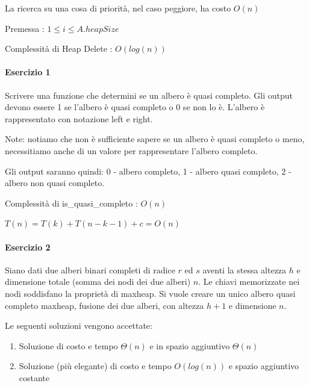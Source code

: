 \documentclass[tikz]{article}
\providecommand{\tightlist}{%
  \setlength{\itemsep}{0pt}\setlength{\parskip}{0pt}}
\let\oldparagraph\paragraph
\renewcommand{\paragraph}[1]{\oldparagraph{#1}\mbox{}}
\begin{document}
{La ricerca su una cosa di priorità, nel caso peggiore, ha costo }$O(n)$

{Premessa : $1 \leq i \leq A.heapSize$}



{Complessità di Heap Delete : }$O(log(n))$

\paragraph{Esercizio 1}

{Scrivere una funzione che determini se un albero è quasi completo. Gli output devono essere 1 se l'albero è quasi completo o 0 se non lo è. }{L'albero è rappresentato con notazione left e right.}

{Note: notiamo che non è sufficiente sapere se un albero è quasi completo o meno, necessitiamo anche di un valore per rappresentare l'albero completo.}

{Gli output saranno quindi: 0 - albero completo, 1 - albero quasi completo, 2 - albero non quasi completo.}





{Complessità di is\_quasi\_completo : $O(n)$}

$T(n) = T(k) + T(n-k-1) + c = O(n)$

\paragraph{Esercizio 2}

{Siano dati due alberi binari completi di radice $r$ ed $s$ aventi la stessa altezza $h$ e dimensione totale (somma dei nodi dei due alberi) $n$. Le chiavi memorizzate nei nodi soddisfano la proprietà di maxheap. Si vuole creare un unico albero quasi completo maxheap, fusione dei due alberi, con altezza $h+1$ e dimensione $n$.}

{Le seguenti soluzioni vengono accettate:}

\begin{enumerate}
\tightlist
\item
  {Soluzione di costo e tempo $\Theta(n)$ e in spazio aggiuntivo $\Theta(n)$}
\item
  {Soluzione (più elegante) di costo e tempo $O(log(n))$ e spazio aggiuntivo costante}
\end{enumerate}
\end{document}
